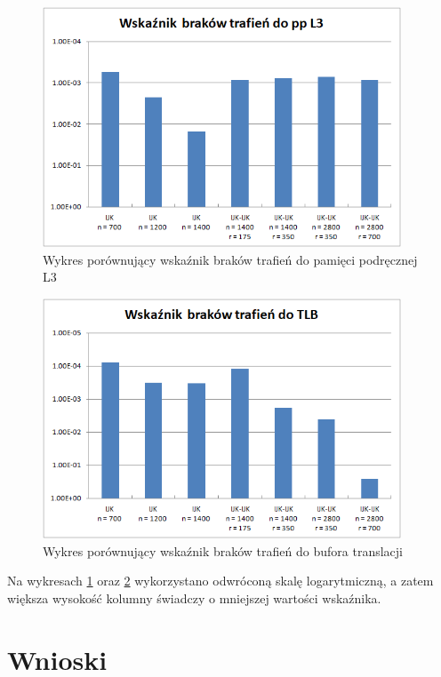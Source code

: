 \documentclass[12pt,a4paper]{article}
\begin{document}
\begin{figure}[H]
  \centering
    \includegraphics[width=0.95\textwidth]{../Results/charts/L3_miss.png}
    \caption{Wykres porównujący wskaźnik braków trafień do pamięci podręcznej L3}
    \label{chart:L3_miss}
\end{figure}


\begin{figure}[H]
  \centering
    \includegraphics[width=0.95\textwidth]{../Results/charts/TLB_miss.png}
    \caption{Wykres porównujący wskaźnik braków trafień do bufora translacji}
    \label{chart:TLB_miss}
\end{figure}

Na wykresach \ref{chart:L3_miss} oraz \ref{chart:TLB_miss} wykorzystano odwróconą skalę logarytmiczną, a zatem większa wysokość kolumny świadczy o mniejszej wartości wskaźnika.

\section{Wnioski}
\end{document}
